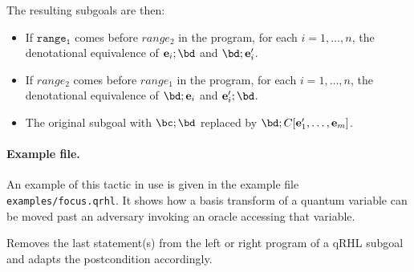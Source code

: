 \documentclass{article}
\begin{document}
The resulting subgoals are then:
\begin{itemize}
\item If $\mathtt{range_1}$ comes before $\mathit{range_2}$ in the program, for each $i=1,\dots,n$, the denotational equivalence of  ${\be_i;\bd}$ and $\bd;\be_i'$.
\item If $\mathit{range_2}$ comes before $\mathit{range_1}$ in the program, for each $i=1,\dots,n$, the denotational equivalence of   $\bd;\be_i$ and ${\be_i';\bd}$.
\item The original subgoal with $\bc;\bd$ replaced by $\bd;C[\be_1',\dots,\be_m]$.
\end{itemize}


\paragraph{Example file.} An example of this tactic in use is given in the example file \texttt{examples/focus.qrhl}.
It shows how a basis transform of a quantum variable can be moved past an adversary invoking an oracle accessing that variable.



Removes the last statement(s) from the left or right program of a qRHL
subgoal and adapts the postcondition accordingly.

\newcommand\WP{\operatorname{wp}}%
\end{document}
